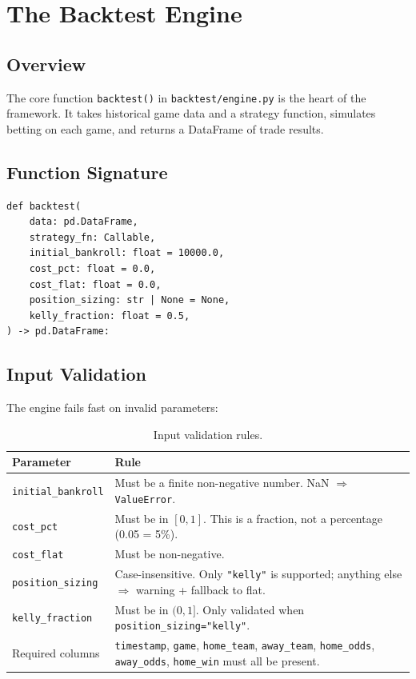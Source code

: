 \documentclass[12pt,a4paper]{report}
\theoremstyle{definition}
\newcommand{\code}[1]{\texttt{#1}}
\newcommand{\file}[1]{\texttt{#1}}
\newcommand{\func}[1]{\texttt{#1()}}
\begin{document}
\chapter{The Backtest Engine}
\label{ch:engine}

\section{Overview}

The core function \func{backtest} in \file{backtest/engine.py} is the heart of the framework. It takes historical game data and a strategy function, simulates betting on each game, and returns a DataFrame of trade results.

\section{Function Signature}

\begin{lstlisting}[caption={backtest() function signature.}]
def backtest(
    data: pd.DataFrame,
    strategy_fn: Callable,
    initial_bankroll: float = 10000.0,
    cost_pct: float = 0.0,
    cost_flat: float = 0.0,
    position_sizing: str | None = None,
    kelly_fraction: float = 0.5,
) -> pd.DataFrame:
\end{lstlisting}

\section{Input Validation}
\label{sec:input-validation}

The engine fails fast on invalid parameters:

\begin{table}[H]
\centering
\caption{Input validation rules.}
\label{tab:validation-rules}
\begin{tabularx}{\textwidth}{lX}
\toprule
\textbf{Parameter} & \textbf{Rule} \\
\midrule
\code{initial\_bankroll} & Must be a finite non-negative number. NaN $\Rightarrow$ \code{ValueError}. \\
\code{cost\_pct}         & Must be in $[0, 1]$. This is a fraction, not a percentage (0.05 = 5\%). \\
\code{cost\_flat}        & Must be non-negative. \\
\code{position\_sizing}  & Case-insensitive. Only \code{"kelly"} is supported; anything else $\Rightarrow$ warning + fallback to flat. \\
\code{kelly\_fraction}   & Must be in $(0, 1]$. Only validated when \code{position\_sizing="kelly"}. \\
Required columns         & \code{timestamp}, \code{game}, \code{home\_team}, \code{away\_team}, \code{home\_odds}, \code{away\_odds}, \code{home\_win} must all be present. \\
\bottomrule
\end{tabularx}
\end{table}
\end{document}
